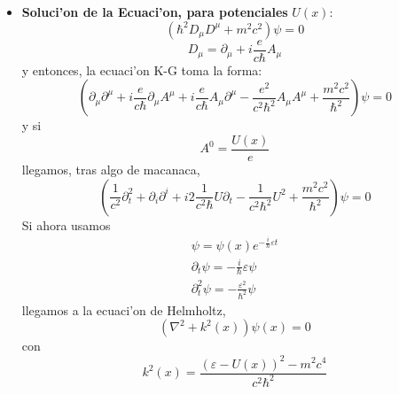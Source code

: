 \begin{itemize}
\item \textbf{Soluci'on de la Ecuaci'on, para potenciales }$U\left(
x\right)  $:
\begin{equation}
\left(  \hbar^{2}D_{\mu}D^{\mu}+m^{2}c^{2}\right)  \psi=0
\end{equation}
\begin{equation}
D_{\mu}=\partial_{\mu}+i\frac{e}{c\hbar}A_{\mu}%
\end{equation}
y entonces, la ecuaci'on K-G toma la forma:
\begin{equation}
\left(  \partial_{\mu}\partial^{\mu}+i\frac{e}{c\hbar}\partial_{\mu}A^{\mu
}+i\frac{e}{c\hbar}A_{\mu}\partial^{\mu}-\frac{e^{2}}{c^{2}\hbar^{2}}A_{\mu
}A^{\mu}+\frac{m^{2}c^{2}}{\hbar^{2}}\right)  \psi=0
\end{equation}
y si
\begin{equation}
A^{0}=\frac{U\left(  x\right)  }{e}%
\end{equation}
llegamos, tras algo de macanaca,
\begin{equation}
\left(  \frac{1}{c^{2}}\partial_{t}^{2}+\partial_{i}\partial^{i}+i2\frac
{1}{c^{2}\hbar}U\partial_{t}-\frac{1}{c^{2}\hbar^{2}}U^{2}+\frac{m%
^{2}c^{2}}{\hbar^{2}}\right)  \psi=0
\end{equation}
Si ahora usamos
\begin{align*}
\psi=\psi\left(  x\right)  e^{-\frac{i}{\hbar}\varepsilon t}\\
\partial_{t}\psi=-\frac{i}{\hbar}\varepsilon\psi\\
\partial_{t}^{2}\psi=-\frac{\varepsilon^{2}}{\hbar^{2}}\psi
\end{align*}
llegamos a la ecuaci'on de Helmholtz,
\begin{equation}
\left(  \nabla^{2}+k^{2}\left(  x\right)  \right)  \psi\left(  x\right)  =0
\end{equation}
con
\begin{equation}
k^{2}\left(  x\right)  =\frac{\left(  \varepsilon-U\left(  x\right)  \right)
^{2}-m^{2}c^{4}}{c^{2}\hbar^{2}}%
\end{equation}



\end{itemize}

